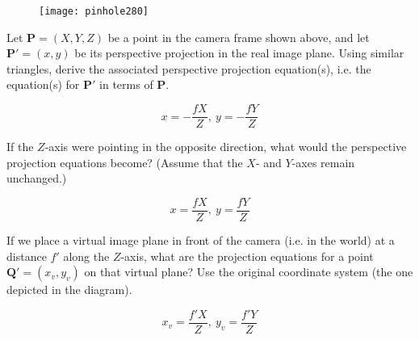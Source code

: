 \begin{blocksection}
\question
\begin{figure}[H]
\centering
\texttt{[image: pinhole280]}
\end{figure}
Let $\mathbf{P} = (X, Y, Z)$ be a point in the camera frame shown above, and let $\mathbf{P'} = (x, y)$ be its perspective projection in the real image plane. Using similar triangles, derive the associated perspective projection equation(s), i.e. the equation(s) for $\mathbf{P'}$ in terms of $\mathbf{P}$.

\begin{solution}[0.75in]
$$x = -\frac{fX}{Z},~y = -\frac{fY}{Z}$$
\end{solution}
\end{blocksection}


\begin{blocksection}
\question If the $Z$-axis were pointing in the opposite direction, what would the perspective projection equations become? (Assume that the $X$- and $Y$-axes remain unchanged.)

\begin{solution}[0.75in]
$$x = \frac{fX}{Z},~y = \frac{fY}{Z}$$
\end{solution}
\end{blocksection}


\begin{blocksection}
\question If we place a virtual image plane in front of the camera (i.e. in the world) at a distance $f'$ along the $Z$-axis, what are the projection equations for a point $\mathbf{Q'} = (x_v, y_v)$ on that virtual plane? Use the original coordinate system (the one depicted in the diagram).

\begin{solution}[0.75in]
$$x_v = \frac{f'X}{Z},~y_v = \frac{f'Y}{Z}$$
\end{solution}
\end{blocksection}
